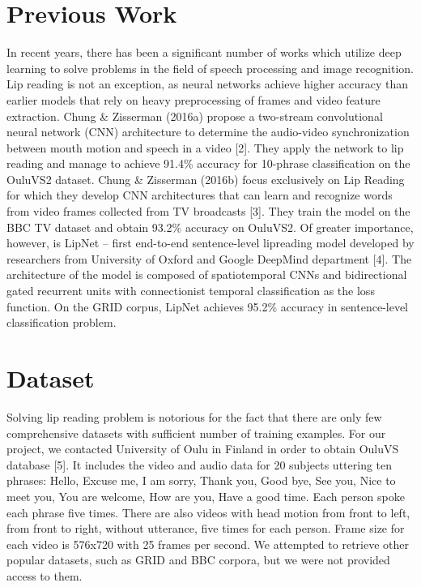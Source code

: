 \documentclass{article}[10pt]
\begin{document}
\begin{multicols}{2}
\section{Previous Work}
In recent years, there has been a significant number of works which utilize deep
learning to solve problems in the field of speech processing and image recognition.
Lip reading is not an exception, as neural networks achieve higher accuracy
than earlier models that rely on heavy preprocessing of frames and video feature
extraction. Chung \& Zisserman (2016a) propose a two-stream convolutional neural
network (CNN) architecture to determine the audio-video synchronization between
mouth motion and speech in a video [2]. They apply the network to lip reading
and manage to achieve 91.4\% accuracy for 10-phrase classification on the OuluVS2
dataset. Chung \& Zisserman (2016b) focus exclusively on Lip Reading for which
they develop CNN architectures that can learn and recognize words from video
frames collected from TV broadcasts [3]. They train the model on the BBC TV
dataset and obtain 93.2\% accuracy on OuluVS2. Of greater importance, however,
is LipNet – first end-to-end sentence-level lipreading model developed by
researchers from University of Oxford and Google DeepMind department [4]. The
architecture of the model is composed of spatiotemporal CNNs and bidirectional
gated recurrent units with connectionist temporal classification as the loss
function. On the GRID corpus, LipNet achieves 95.2\% accuracy in sentence-level
classification problem.
\section{Dataset}
Solving lip reading problem is notorious for the fact that there are only few
comprehensive datasets with sufficient number of training examples. For our
project, we contacted University of Oulu in Finland in order to obtain OuluVS
database [5]. It includes the video and audio data for 20 subjects uttering
ten phrases: Hello, Excuse me, I am sorry, Thank you, Good bye, See you, Nice to
meet you, You are welcome, How are you, Have a good time. Each person spoke each
phrase five times. There are also videos with head motion from front to left,
from front to right, without utterance, five times for each person. Frame size
for each video is 576x720 with 25 frames per second. We attempted to retrieve
other popular datasets, such as GRID and BBC corpora, but we were not provided
access to them.\\


\end{multicols}
\end{document}
